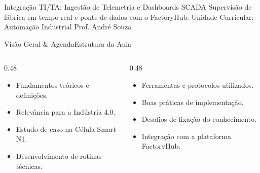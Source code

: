 
\senaicover
  {Integração TI/TA: Ingestão de Telemetria e Dashboards SCADA}
  {Supervisão de fábrica em tempo real e ponte de dados com o FactoryHub.}
  {Unidade Curricular: Automação Industrial}
  {Prof. André Souza}

\begin{senaiframe}{Visão Geral \& Agenda}{Estrutura da Aula}
  \begin{columns}[t]
    \begin{column}{0.48\textwidth}
      \begin{tcolorbox}[senaibluecard, title={1. Conceitos Chave}]
        \begin{itemize}
          \item Fundamentos teóricos e definições.
          \item Relevância para a Indústria 4.0.
        \end{itemize}
      \end{tcolorbox}
      \vspace{4pt}
      \begin{tcolorbox}[senaiambercard, title={3. Aplicação Prática}]
        \begin{itemize}
          \item Estudo de caso na Célula Smart N1.
          \item Desenvolvimento de rotinas técnicas.
        \end{itemize}
      \end{tcolorbox}
    \end{column}
    \begin{column}{0.48\textwidth}
      \begin{tcolorbox}[senairedcard, title={2. Detalhamento Técnico}]
        \begin{itemize}
          \item Ferramentas e protocolos utilizados.
          \item Boas práticas de implementação.
        \end{itemize}
      \end{tcolorbox}
      \vspace{4pt}
      \begin{tcolorbox}[senaigreencard, title={4. Exercícios \& Avaliação}]
        \begin{itemize}
          \item Desafios de fixação do conhecimento.
          \item Integração com a plataforma FactoryHub.
        \end{itemize}
      \end{tcolorbox}
    \end{column}
  \end{columns}
\end{senaiframe}

